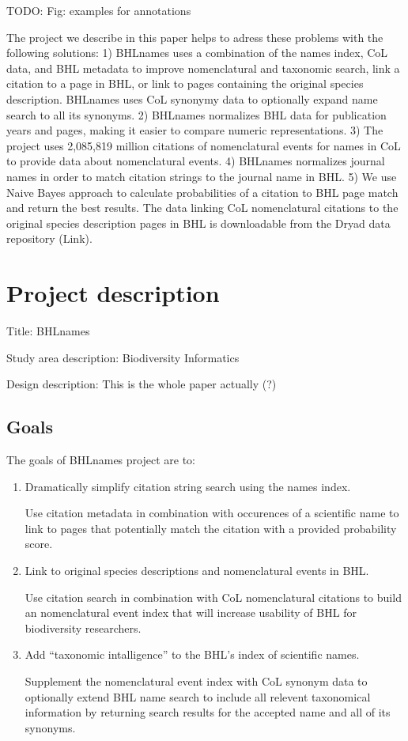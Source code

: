 \documentclass[
]{article}
\begin{document}
TODO: Fig: examples for annotations

The project we describe in this paper helps to adress these problems
with the following solutions: 1) BHLnames uses a combination of the
names index, CoL data, and BHL metadata to improve nomenclatural and
taxonomic search, link a citation to a page in BHL, or link to pages
containing the original species description. BHLnames uses CoL synonymy
data to optionally expand name search to all its synonyms. 2) BHLnames
normalizes BHL data for publication years and pages, making it easier to
compare numeric representations. 3) The project uses 2,085,819 million
citations of nomenclatural events for names in CoL to provide data about
nomenclatural events. 4) BHLnames normalizes journal names in order to
match citation strings to the journal name in BHL. 5) We use Naive Bayes
approach to calculate probabilities of a citation to BHL page match and
return the best results. The data linking CoL nomenclatural citations to
the original species description pages in BHL is downloadable from the
Dryad data repository (Link).

\hypertarget{project-description}{%
\section{Project description}\label{project-description}}

Title: BHLnames

Study area description: Biodiversity Informatics

Design description: This is the whole paper actually (?)

\hypertarget{goals}{%
\subsection{Goals}\label{goals}}

The goals of BHLnames project are to:

\begin{enumerate}
\def\labelenumi{\arabic{enumi}.}
\item
  Dramatically simplify citation string search using the names index.

  Use citation metadata in combination with occurences of a scientific
  name to link to pages that potentially match the citation with a
  provided probability score.
\item
  Link to original species descriptions and nomenclatural events in BHL.

  Use citation search in combination with CoL nomenclatural citations to
  build an nomenclatural event index that will increase usability of BHL
  for biodiversity researchers.
\item
  Add ``taxonomic intalligence'' to the BHL's index of scientific names.

  Supplement the nomenclatural event index with CoL synonym data to
  optionally extend BHL name search to include all relevent taxonomical
  information by returning search results for the accepted name and all
  of its synonyms.
\end{enumerate}
\end{document}
